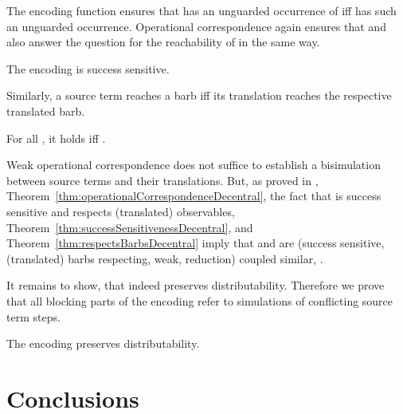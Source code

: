 \documentclass[copyright,creativecommons]{eptcs}
\begin{document}
The encoding function ensures that  has an unguarded occurrence of  iff  has such an unguarded occurrence. Operational correspondence again ensures that  and  also answer the question for the reachability of  in the same way.

\begin{theorem}
	The encoding  is success sensitive.
	\label{thm:successSensitivenessDecentral}
\end{theorem}

Similarly, a source term reaches a barb iff its translation reaches the respective translated barb.

\begin{theorem}
	For all , it holds  iff .
	\label{thm:respectsBarbsDecentral}
\end{theorem}

Weak operational correspondence does not suffice to establish a bisimulation between source terms and their translations.
But, as proved in \cite{petersGlabbeek15}, Theorem~\ref{thm:operationalCorrespondenceDecentral}, the fact that  is success sensitive and respects (translated) observables, Theorem~\ref{thm:successSensitivenessDecentral}, and Theorem~\ref{thm:respectsBarbsDecentral} imply that  and  are (success sensitive, (translated) barbs respecting, weak, reduction) coupled similar, \ie .

It remains to show, that  indeed preserves distributability. Therefore we prove that all blocking parts of the encoding  refer to simulations of conflicting source term steps.

\begin{theorem}
	The encoding  preserves distributability.
	\label{thm:distributability}
\end{theorem}


\section{Conclusions}
\label{sec:conclusion}
 
\end{document}
